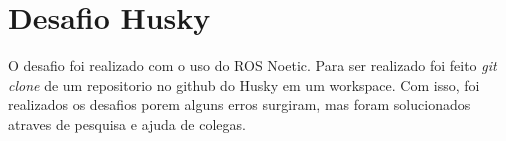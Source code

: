 \section{Desafio Husky}

O desafio foi realizado com o uso do ROS Noetic. Para ser realizado foi feito \textit{git clone} de um repositorio no github do Husky em um workspace. Com isso, foi realizados os desafios porem alguns erros surgiram, mas foram solucionados atraves de pesquisa e ajuda de colegas.




